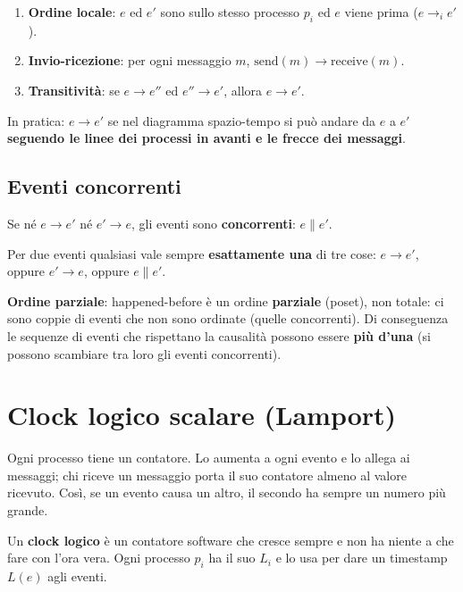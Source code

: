 \begin{enumerate}
\def\labelenumi{\arabic{enumi}.}
\tightlist
\item
  \textbf{Ordine locale}: \(e\) ed \(e'\) sono sullo stesso processo \(p_i\) ed \(e\) viene prima (\(e \to_i e'\)).
\item
  \textbf{Invio-ricezione}: per ogni messaggio \(m\), \(\text{send}(m) \to \text{receive}(m)\).
\item
  \textbf{Transitività}: se \(e \to e''\) ed \(e'' \to e'\), allora \(e \to e'\).
\end{enumerate}

In pratica: \(e \to e'\) se nel diagramma spazio-tempo si può andare da \(e\) a \(e'\) \textbf{seguendo le linee dei processi in avanti e le frecce dei messaggi}.

\subsection{Eventi concorrenti}

Se né \(e \to e'\) né \(e' \to e\), gli eventi sono \textbf{concorrenti}: \(e \parallel e'\).

Per due eventi qualsiasi vale sempre \textbf{esattamente una} di tre cose: \(e \to e'\), oppure \(e' \to e\), oppure \(e \parallel e'\).

\textbf{Ordine parziale}: happened-before è un ordine \textbf{parziale} (poset), non totale: ci sono coppie di eventi che non sono ordinate (quelle concorrenti). Di conseguenza le sequenze di eventi che rispettano la causalità possono essere \textbf{più d'una} (si possono scambiare tra loro gli eventi concorrenti).

\section{Clock logico scalare (Lamport)}

\begin{inbreve}

Ogni processo tiene un contatore. Lo aumenta a ogni evento e lo allega ai messaggi; chi riceve un messaggio porta il suo contatore almeno al valore ricevuto. Così, se un evento causa un altro, il secondo ha sempre un numero più grande.

\end{inbreve}

Un \textbf{clock logico} è un contatore software che cresce sempre e non ha niente a che fare con l'ora vera. Ogni processo \(p_i\) ha il suo \(L_i\) e lo usa per dare un timestamp \(L(e)\) agli eventi.

